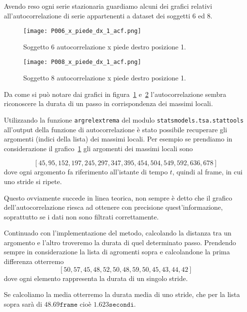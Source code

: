 \begin{sloppypar}
Avendo reso ogni serie stazionaria guardiamo alcuni dei grafici relativi all'autocorrelazione
di serie appartenenti a dataset dei soggetti $6$ ed $8$.
\end{sloppypar}

\begin{figure}[H]
    \centering
    \texttt{[image: P006\_x\_piede\_dx\_1\_acf.png]}
    \caption{Soggetto $6$ autocorrelazione x piede destro posizione 1.}
    \label{fig:P006_x_piede_dx_1_acf}
\end{figure}

\begin{figure}[H]
    \centering
    \texttt{[image: P008\_x\_piede\_dx\_1\_acf.png]}
    \caption{Soggetto $8$ autocorrelazione x piede destro posizione 1.}
    \label{fig:P008_x_piede_dx_1_acf}
\end{figure}

Da come si può notare dai grafici in figura~\ref{fig:P006_x_piede_dx_1_acf} e~\ref{fig:P008_x_piede_dx_1_acf}
l'autocorrelazione sembra riconoscere la durata di un passo in corrispondenza dei massimi locali.
\begin{sloppypar}
Utilizzando la funzione \texttt{argrelextrema} del modulo \texttt{statsmodels.tsa.stattools}
all'output della funzione di autocorrelazione è stato possibile recuperare gli argomenti (indici della lista) dei massimi locali.
Per esempio se prendiamo in considerazione il grafico~\ref{fig:P006_x_piede_dx_1_acf} gli argomenti
dei massimi locali sono
\end{sloppypar}
\[ [45, 95, 152, 197, 245, 297, 347, 395, 454, 504, 549, 592, 636, 678] \]
dove ogni argomento fa riferimento all'istante di tempo $t$, quindi al frame, in cui uno stride si ripete.

Questo ovviamente succede in linea teorica, non sempre è detto che il grafico dell'autocorrelazione
riesca ad ottenere con precisione quest'informazione, soprattutto se i dati non sono filtrati correttamente.

Continuado con l'implementazione del metodo, calcolando la distanza tra un argomento e l'altro troveremo
la durata di quel determinato passo. Prendendo sempre in considerazione la lista di agromenti sopra
e calcolandone la prima differenza otterremo
\[[50, 57, 45, 48, 52, 50, 48, 59, 50, 45, 43, 44, 42]\]
dove ogni elemento rappresenta la durata di un singolo stride.

Se calcoliamo la media otterremo la durata media di uno stride, che per la lista sopra sarà di 
$48.69\texttt{frame}$ cioè $1.623\texttt{secondi}$.

